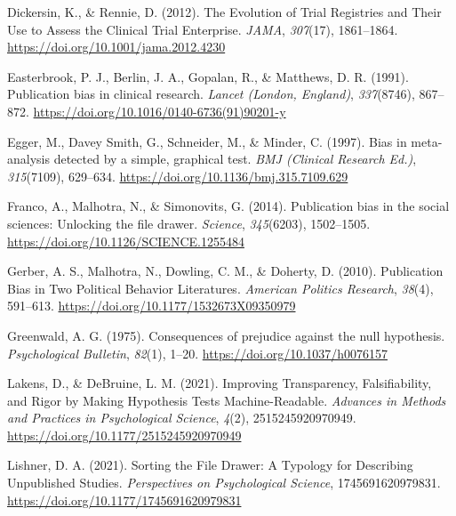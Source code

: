 \documentclass[
  ,jou, a4paper,floatsintext]{apa6}
\newlength{\cslhangindent}
\newlength{\cslentryspacingunit} %
\newenvironment{CSLReferences}[2] %
 {%
  \setlength{\parindent}{0pt}
  \ifodd #1
  \let\oldpar\par
  \def\par{\hangindent=\cslhangindent\oldpar}
  \fi
  \setlength{\parskip}{#2\cslentryspacingunit}
 }%
 {}
\begin{document}
\begin{CSLReferences}{1}{0}
\leavevmode{}%
Dickersin, K., \& Rennie, D. (2012). The {Evolution} of {Trial Registries} and {Their Use} to {Assess} the {Clinical Trial Enterprise}. \emph{JAMA}, \emph{307}(17), 1861--1864. \url{https://doi.org/10.1001/jama.2012.4230}

\leavevmode{}%
Easterbrook, P. J., Berlin, J. A., Gopalan, R., \& Matthews, D. R. (1991). Publication bias in clinical research. \emph{Lancet (London, England)}, \emph{337}(8746), 867--872. \url{https://doi.org/10.1016/0140-6736(91)90201-y}

\leavevmode{}%
Egger, M., Davey Smith, G., Schneider, M., \& Minder, C. (1997). Bias in meta-analysis detected by a simple, graphical test. \emph{BMJ (Clinical Research Ed.)}, \emph{315}(7109), 629--634. \url{https://doi.org/10.1136/bmj.315.7109.629}

\leavevmode{}%
Franco, A., Malhotra, N., \& Simonovits, G. (2014). Publication bias in the social sciences: {Unlocking} the file drawer. \emph{Science}, \emph{345}(6203), 1502--1505. \url{https://doi.org/10.1126/SCIENCE.1255484}

\leavevmode{}%
Gerber, A. S., Malhotra, N., Dowling, C. M., \& Doherty, D. (2010). Publication {Bias} in {Two Political Behavior Literatures}. \emph{American Politics Research}, \emph{38}(4), 591--613. \url{https://doi.org/10.1177/1532673X09350979}

\leavevmode{}%
Greenwald, A. G. (1975). Consequences of prejudice against the null hypothesis. \emph{Psychological Bulletin}, \emph{82}(1), 1--20. \url{https://doi.org/10.1037/h0076157}

\leavevmode{}%
Lakens, D., \& DeBruine, L. M. (2021). Improving {Transparency}, {Falsifiability}, and {Rigor} by {Making Hypothesis Tests Machine-Readable}. \emph{Advances in Methods and Practices in Psychological Science}, \emph{4}(2), 2515245920970949. \url{https://doi.org/10.1177/2515245920970949}

\leavevmode{}%
Lishner, D. A. (2021). Sorting the {File Drawer}: {A Typology} for {Describing Unpublished Studies}. \emph{Perspectives on Psychological Science}, 1745691620979831. \url{https://doi.org/10.1177/1745691620979831}


\end{CSLReferences}
\end{document}
